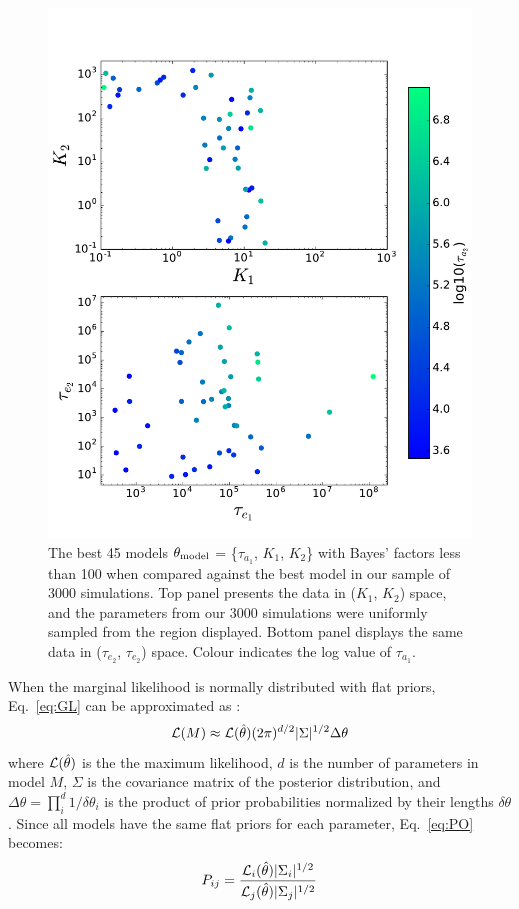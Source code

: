 \begin{figure}
\includegraphics[width=\columnwidth]{chap6/images/plot_good_ones.pdf}
\caption{The best 45 models $\theta_{\rm model}$ = \{$\tau_{a_1}$, $K_1$, $K_2$\} with Bayes' factors less than 100 when compared against the best model in our sample of 3000 simulations. 
Top panel presents the data in ($K_1$, $K_2$) space, and the parameters from our 3000 simulations were uniformly sampled from the region displayed. 
Bottom panel displays the same data in ($\tau_{e_2}$, $\tau_{e_2}$) space. 
Colour indicates the log value of $\tau_{a_1}$.
 }
\label{fig:goodones}
\end{figure}

When the marginal likelihood is normally distributed with flat priors, Eq.~\ref{eq:GL} can be approximated as \citep{Kass1995, Gregory2005}:
\begin{equation}
\mathcal{L}(M) \approx \mathcal{L}(\hat{\theta}) (2\pi)^{d/2} |\Sigma|^{1/2} \Delta \theta
\label{eq:Lapprox}
\end{equation}
where $\mathcal{L}(\hat{\theta})$ is the the maximum likelihood, $d$ is the number of parameters in model $M$, $\Sigma$ is the covariance matrix of the posterior distribution, and $\Delta \theta = \prod_i^d 1/\delta \theta_i$ is the product of prior probabilities normalized by their lengths $\delta \theta$.
Since all models have the same flat priors for each parameter, Eq.~\ref{eq:PO} becomes:
\begin{equation}
P_{ij} = \frac{\mathcal{L}_i(\hat{\theta}) |\Sigma_i|^{1/2}}{\mathcal{L}_j(\hat{\theta}) |\Sigma_j|^{1/2}}
\label{eq:POapprox}
\end{equation}

